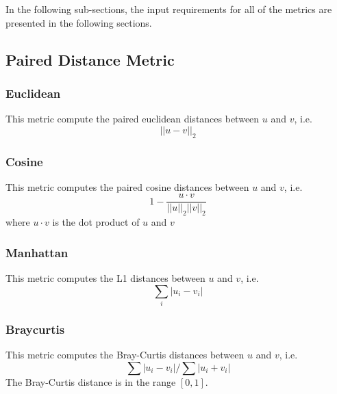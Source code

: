 In the following sub-sections, the input requirements for all of the metrics are presented in the following sections.

\subsection{Paired Distance Metric}
\label{subsection:pairedDistance}

\subsubsection{Euclidean}
This metric compute the paired euclidean distances between $u$ and $v$, i.e.
\begin{equation}
  {||u-v||}_2
\end{equation}


\subsubsection{Cosine}
This metric computes the paired cosine distances between $u$ and $v$, i.e.
\begin{equation}
  1 - \frac{u \cdot v}{||u||_2 ||v||_2}
\end{equation}
where $u \cdot v$ is the dot product of $u$ and $v$


\subsubsection{Manhattan}
This metric computes the L1 distances between $u$ and $v$, i.e.
\begin{equation}
  \sum_i {\left| u_i - v_i \right|}
\end{equation}


\subsubsection{Braycurtis}
This metric computes the Bray-Curtis distances between $u$ and $v$, i.e.
\begin{equation}
  \sum{|u_i-v_i|} / \sum{|u_i+v_i|}
\end{equation}
The Bray-Curtis distance is in the range $[0, 1]$.

